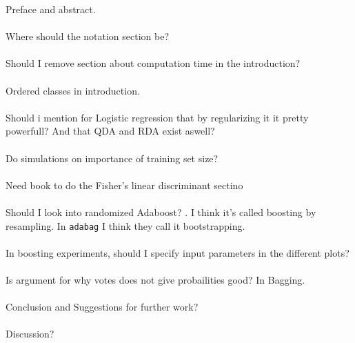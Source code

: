 Preface and abstract.\\
\\
Where should the notation section be? \\
\\
Should I remove section about computation time in the introduction? \\
\\
Ordered classes in introduction.\\
\\
Should i mention for Logistic regression that by regularizing it it pretty powerfull? And that QDA and RDA exist aswell?\\
\\
Do simulations on importance of training set size? \\
\\
Need book to do the Fisher's linear discriminant sectino\\
\\
Should I look into randomized Adaboost? \cite{freund1996}. I think it's called boosting by resampling. In \verb+adabag+ I think they call it bootstrapping.\\
\\
In boosting experiments, should I specify input parameters in the different plots? \\
\\
Is argument for why votes does not give probailities good? In Bagging.\\
\\
Conclusion and Suggestions for further work?\\
\\
Discussion?\\
\\

